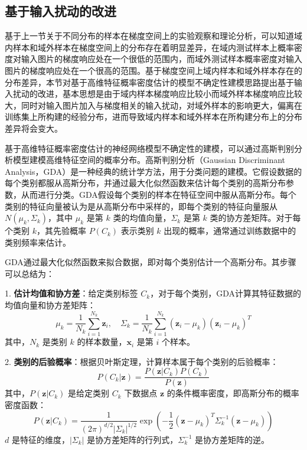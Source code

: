 \subsection{基于输入扰动的改进}
基于上一节关于不同分布的样本在梯度空间上的实验观察和理论分析，可以知道域内样本和域外样本在梯度空间上的分布存在着明显差异，在域内测试样本上概率密度对输入图片的梯度响应处在一个很低的范围内，而域外测试样本概率密度对输入图片的梯度响应处在一个很高的范围。基于梯度空间上域内样本和域外样本存在的分布差异，本节对基于高维特征概率密度估计的模型不确定性建模思路提出基于输入扰动的改进，基本思想是由于域内样本梯度响应比较小而域外样本梯度响应比较大，同时对输入图片加入与梯度相关的输入扰动，对域外样本的影响更大，偏离在训练集上所构建的经验分布，进而导致域内样本和域外样本在所构建分布上的分布差异将会变大。

基于高维特征概率密度估计的神经网络模型不确定性的建模，可以通过高斯判别分析模型建模高维特征空间的概率分布。高斯判别分析（Gaussian Discriminant Analysis，GDA）是一种经典的统计学方法，用于分类问题的建模。它假设数据的每个类别都服从高斯分布，并通过最大化似然函数来估计每个类别的高斯分布参数，从而进行分类。GDA假设每个类别的样本在特征空间中服从高斯分布。每个类别的特征向量被认为是从高斯分布中采样的，即每个类别的特征向量服从 \( N(\mu_k, \Sigma_k) \)，其中 \( \mu_k \) 是第 \( k \) 类的均值向量，\( \Sigma_k \) 是第 \( k \) 类的协方差矩阵。对于每个类别 \( k \)，其先验概率 \( P(C_k) \) 表示类别 \( k \) 出现的概率，通常通过训练数据中的类别频率来估计。



GDA通过最大化似然函数来拟合数据，即对每个类别估计一个高斯分布。其步骤可以总结为：

1. \textbf{估计均值和协方差}：给定类别标签 \( C_k \)，对于每个类别，GDA计算其特征数据的均值向量和协方差矩阵：
   \[
   \mu_k = \frac{1}{N_k} \sum_{i=1}^{N_k} \mathbf{z}_i, \quad \Sigma_k = \frac{1}{N_k} \sum_{i=1}^{N_k} (\mathbf{z}_i - \mu_k)(\mathbf{z}_i - \mu_k)^T
   \]
   其中，\( N_k \) 是类别 \( k \) 的样本数量，\( \mathbf{x}_i \) 是第 \( i \) 个样本。

2. \textbf{类别的后验概率}：根据贝叶斯定理，计算样本属于每个类别的后验概率：
   \[
   P(C_k|\mathbf{z}) = \frac{P(\mathbf{z}|C_k) P(C_k)}{P(\mathbf{z})}
   \]
   其中，\( P(\mathbf{z}|C_k) \) 是给定类别 \( C_k \) 下数据点 \( \mathbf{z} \) 的条件概率密度，即高斯分布的概率密度函数：
   \[
   P(\mathbf{z}|C_k) = \frac{1}{(2\pi)^{d/2} |\Sigma_k|^{1/2}} \exp\left(-\frac{1}{2} (\mathbf{z} - \mu_k)^T \Sigma_k^{-1} (\mathbf{z} - \mu_k)\right)
   \]
   \( d \) 是特征的维度，\( |\Sigma_k| \) 是协方差矩阵的行列式，\( \Sigma_k^{-1} \) 是协方差矩阵的逆。


